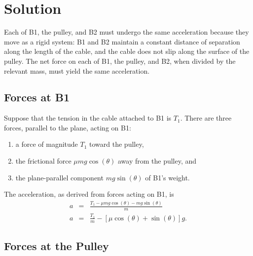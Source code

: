 \documentclass[twocolumn]{article}
\begin{document}
\section{Solution}

Each of B1, the pulley, and B2 must undergo the same acceleration because they
move as a rigid system: B1 and B2 maintain a constant distance of separation
along the length of the cable, and the cable does not slip along the surface of
the pulley.  The net force on each of B1, the pulley, and B2, when divided by
the relevant mass, must yield the same acceleration.

\subsection{Forces at B1}

Suppose that the tension in the cable attached to B1 is $T_1$. There are three
forces, parallel to the plane, acting on B1:
\begin{enumerate}
      \item a force of magnitude $T_1$ toward the pulley,
      \item the frictional force $\mu m g \cos(\theta)$ away from the pulley,
         and
      \item the plane-parallel component $m g \sin(\theta)$ of B1's weight.
\end{enumerate}
The acceleration, as derived from forces acting on B1, is
\begin{eqnarray}
   \nonumber
   a &=& \frac{T_1 - \mu m g \cos(\theta) - m g \sin(\theta)}{m}\\
   a &=& \frac{T_1}{m} - [\mu \cos(\theta) + \sin(\theta)] g.
   \label{eq:B1}
\end{eqnarray}

\subsection{Forces at the Pulley}
\end{document}
